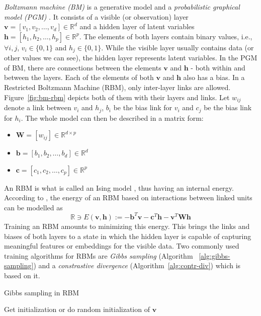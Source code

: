 \textit{Boltzmann machine (BM)} is a generative model and a
\textit{probabilistic graphical model (PGM)} \cite{Bishop.2006}. It consists of
a visible (or observation) layer
$\mathbf{v}=[v_1,v_2,\ldots,v_d]\in\mathbb{R}^d$ and a hidden layer of latent
variables $\mathbf{h}=[h_1,h_2,\ldots,h_p]\in\mathbb{R}^p$. The elements of both
layers contain binary values, i.e., $\forall i,j$, $v_i\in\{0,1\}$ and
$h_j\in\{0,1\}$. While the visible layer usually contains data (or other values
we can see), the hidden layer represents latent variables. In the PGM of BM,
there are connections between the elements $\mathbf{v}$ and $\mathbf{h}$ - both
within and between the layers. Each of the elements of both $\mathbf{v}$ and
$\mathbf{h}$ also has a bias. In a Restricted Boltzmann Machine (RBM), only
inter-layer links are allowed. Figure~\ref{fig:bm-rbm} depicts both of them with
their layers and links. Let $w_{ij}$ denote a link between $v_i$ and $h_j$,
$b_i$ be the bias link for $v_i$ and $c_j$ be the bias link for $h_i$. The whole
model can then be described in a matrix form: 
\begin{samepage}
	\begin{itemize}
		\item $\mathbf{W}=[w_{ij}]\in\mathbb{R}^{d\times p}$
		\item $\mathbf{b}=[b_1,b_2,\ldots,b_d]\in\mathbb{R}^d$
		\item $\mathbf{c}=[c_1,c_2,\ldots,c_p]\in\mathbb{R}^p$
	\end{itemize}
\end{samepage}
An RBM is what is called an Ising model \cite{Ising.1925}, thus having an
internal energy. According to \citet{Hinton.1983}, the energy of an RBM based on
interactions between linked units can be modelled as
\begin{equation}
	\mathbb{R}\ni E(\mathbf{v},\mathbf{h}):=-\mathbf{b}^T\mathbf{v}-\mathbf{c}^T\mathbf{h}-\mathbf{v}^T\mathbf{W}\mathbf{h}
	\label{eq:E_rbm}
\end{equation}
Training an RBM amounts to minimizing this energy. This brings the links and
biases of both layers to a state in which the hidden layer is capable of
capturing meaningful features or embeddings for the visible data. Two commonly  
used training algorithms for RBMs are \textit{Gibbs sampling} (Algorithm~
\ref{alg:gibbs-sampling}) and a \textit{constrastive divergence} 
(Algorithm~\ref{alg:contr-div}) which is based on it.

\begin{algorithm}
    \caption{Gibbs sampling in RBM}
    \label{alg:gibbs-sampling}
	Get initialization or do random initialization of $\mathbf{v}$\;
\end{algorithm}

